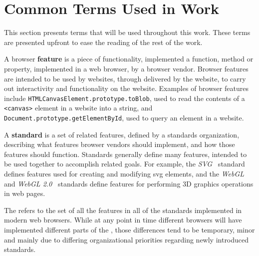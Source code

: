 \section{Common Terms Used in Work}
\label{intro:terms}

This section presents terms that will be used throughout this work.  These
terms are presented upfront to ease the reading of the rest of the work.

A browser \textbf{feature} is a piece of functionality, implemented a
\JS function, method or property, implemented in a web browser, by a browser
vendor.  Browser features are intended to be used by websites, through
\JS delivered by the website, to carry out interactivity and functionality
on the website.  Examples of browser features include
\texttt{HTMLCanvasElement.prototype.toBlob}, used to read the contents of
a \texttt{<canvas>} element in a website into a string, and
\texttt{Document.prototype.getElementById}, used to query an element in a
website.

A \textbf{standard} is a set of related features, defined by a standards
organization, describing what features browser vendors should implement, and
how those features should function.  Standards generally define many features,
intended to be used together to accomplish related goals.  For example, the
\textit{SVG}~\cite{svg2011standard} standard defines features used for creating
and modifying \gls{svg} elements, and the
\textit{WebGL}~\cite{webgl2015standard} and \textit{WebGL
2.0}~\cite{webgl22018standard} standards define features for performing 3D
graphics operations in web pages.

The \textbf{\WAPI} refers to the set of all the features in all of the standards
implemented in modern web browsers. While at any point in time different
browsers will have implemented different parts of the \WAPI, those differences
tend to be temporary, minor and mainly due to differing organizational
priorities regarding newly introduced standards.
